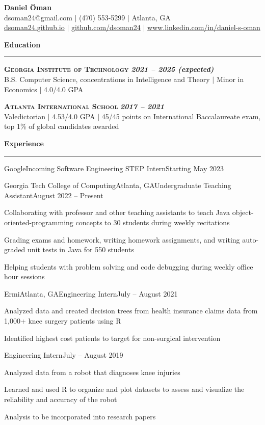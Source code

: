 \documentclass{article}
\newcommand{\horizontal}{\vspace{3pt}\hrule}
\newcommand{\school}[3]{\vspace{3pt}\textsc{\textbf{#1}} \hfill \textbf{\textit{#2}} \\ #3}
\newcommand{\sectitle}[1]{\vspace{3pt} \textbf{\large #1} \horizontal}
\begin{document}
\thispagestyle{empty}
\begin{center}
    \textbf{\LARGE Daniel Öman} \\
    dsoman24@gmail.com $|$ (470) 553-5299 $|$ Atlanta, GA \\
    \href{https://dsoman24.github.io/}{dsoman24.github.io} $|$ \href{https://github.com/dsoman24}{github.com/dsoman24} $|$ \href{https://www.linkedin.com/in/daniel-s-oman/}{www.linkedin.com/in/daniel-s-oman}
\end{center}

\begin{flushleft}
\sectitle{Education}

\school{Georgia Institute of Technology}{2021 -- 2025 (expected)}
{B.S. Computer Science, concentrations in Intelligence and Theory $|$ Minor in Economics $|$ 4.0/4.0 GPA}

\school{Atlanta International School}{2017 -- 2021}
{Valedictorian $|$ 4.53/4.0 GPA $|$ 45/45 points on International Baccalaureate exam, top 1\% of global candidates awarded}

\sectitle{Experience}

    \begin{experience_no_list}{Google}{}{Incoming Software Engineering STEP Intern}{Starting May 2023}
    \end{experience_no_list}

    \begin{experience}{Georgia Tech College of Computing}{Atlanta, GA}{Undergraduate Teaching Assistant}{August 2022 -- Present}
        \item Collaborating with professor and other teaching assistants to teach Java object-oriented-programming concepts to 30 students during weekly recitations
        \item Grading exams and homework, writing homework assignments, and writing auto-graded unit tests in Java for 550 students
        \item Helping students with problem solving and code debugging during weekly office hour sessions
    \end{experience}

    \begin{experience}{Ermi}{Atlanta, GA}{Engineering Intern}{July -- August 2021}
        \item Analyzed data and created decision trees from health insurance claims data from 1,000+ knee surgery patients using R
        \item Identified highest cost patients to target for non-surgical intervention
    \end{experience}
    \begin{subexperience}{Engineering Intern}{July -- August 2019}
        \item Analyzed data from a robot that diagnoses knee injuries
        \item Learned and used R to organize and plot datasets to assess and visualize the reliability and accuracy of the robot
        \item Analysis to be incorporated into research papers
    \end{subexperience}


\end{flushleft}
\end{document}
